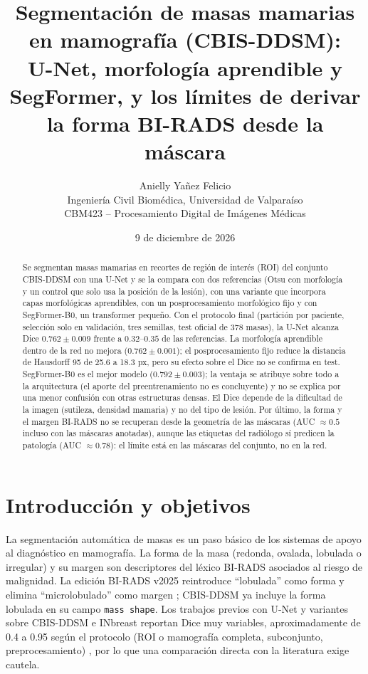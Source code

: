 \documentclass[11pt,a4paper]{article}
\title{Segmentación de masas mamarias en mamografía (CBIS-DDSM):\\
U-Net, morfología aprendible y SegFormer, y los límites de derivar la forma BI-RADS desde la máscara}
\author{Anielly Yañez Felicio\\
\small Ingeniería Civil Biomédica, Universidad de Valparaíso\\
\small CBM423 -- Procesamiento Digital de Imágenes Médicas}
\date{9 de diciembre de 2026}
\begin{document}
\maketitle

\begin{abstract}
Se segmentan masas mamarias en recortes de región de interés (ROI) del conjunto CBIS-DDSM con una U-Net y se la compara con dos referencias (Otsu con morfología y un control que solo usa la posición de la lesión), con una variante que incorpora capas morfológicas aprendibles, con un posprocesamiento morfológico fijo y con SegFormer-B0, un transformer pequeño. Con el protocolo final (partición por paciente, selección solo en validación, tres semillas, test oficial de 378 masas), la U-Net alcanza Dice $0.762 \pm 0.009$ frente a $0.32$--$0.35$ de las referencias. La morfología aprendible dentro de la red no mejora ($0.762 \pm 0.001$); el posprocesamiento fijo reduce la distancia de Hausdorff 95 de 25.6 a 18.3 px, pero su efecto sobre el Dice no se confirma en test. SegFormer-B0 es el mejor modelo ($0.792 \pm 0.003$); la ventaja se atribuye sobre todo a la arquitectura (el aporte del preentrenamiento no es concluyente) y no se explica por una menor confusión con otras estructuras densas. El Dice depende de la dificultad de la imagen (sutileza, densidad mamaria) y no del tipo de lesión. Por último, la forma y el margen BI-RADS no se recuperan desde la geometría de las máscaras (AUC $\approx 0.5$ incluso con las máscaras anotadas), aunque las etiquetas del radiólogo sí predicen la patología (AUC $\approx 0.78$): el límite está en las máscaras del conjunto, no en la red.
\end{abstract}

\section{Introducción y objetivos}
La segmentación automática de masas es un paso básico de los sistemas de apoyo al diagnóstico en mamografía. La forma de la masa (redonda, ovalada, lobulada o irregular) y su margen son descriptores del léxico BI-RADS asociados al riesgo de malignidad. La edición BI-RADS v2025 reintroduce ``lobulada'' como forma y elimina ``microlobulado'' como margen \citep{acr2025birads}; CBIS-DDSM \citep{lee2017cbisddsm} ya incluye la forma lobulada en su campo \texttt{mass shape}. Los trabajos previos con U-Net y variantes sobre CBIS-DDSM e INbreast reportan Dice muy variables, aproximadamente de 0.4 a 0.95 según el protocolo (ROI o mamografía completa, subconjunto, preprocesamiento) \citep{abdelhafiz2020,baccouche2021connected}, por lo que una comparación directa con la literatura exige cautela.
\end{document}
